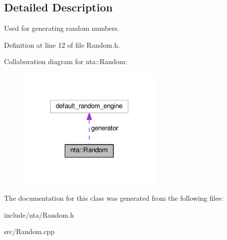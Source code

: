 \subsection{Detailed Description}
Used for generating random numbers. 

Definition at line 12 of file Random.\+h.



Collaboration diagram for nta\+:\+:Random\+:
\nopagebreak
\begin{figure}[H]
\begin{center}
\leavevmode
\includegraphics[width=197pt]{de/dda/classnta_1_1Random__coll__graph}
\end{center}
\end{figure}


The documentation for this class was generated from the following files\+:\begin{DoxyCompactItemize}
\item 
include/nta/Random.\+h\item 
src/Random.\+cpp\end{DoxyCompactItemize}
